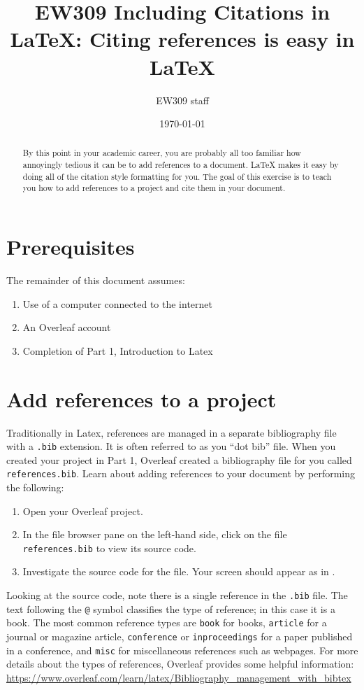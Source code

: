 \documentclass[10pt]{article}
\title{EW309 Including Citations in \LaTeX: Citing references is easy in \LaTeX}
\author{EW309 staff}
\date{\today}
\renewcommand{\LaTeX}{Latex}
\begin{document}
\maketitle 

\begin{abstract}
  By this point in your academic career, you are probably all too familiar how annoyingly tedious it can be to add references to a document. LaTeX makes it easy by doing all of the citation style formatting for you. The goal of this exercise is to teach you how to add references to a project and cite them in your document.
\end{abstract}

\section{Prerequisites}
The remainder of this document assumes:
\begin{enumerate}
\item Use of a computer connected to the internet
\item An Overleaf account
\item Completion of Part 1, Introduction to \LaTeX
\end{enumerate}

\section{Add references to a project}
Traditionally in \LaTeX, references are managed in a separate bibliography file with a \lstinline{.bib} extension. It is often referred to as you ``dot bib'' file. When you created your project in Part 1, Overleaf created a bibliography file for you called \lstinline{references.bib}. Learn about adding references to your document by performing the following:
\begin{enumerate}
\item Open your Overleaf project.
\item In the file browser pane on the left-hand side, click on the file \lstinline{references.bib} to view its source code.
\item Investigate the source code for the file. Your screen should appear as in .
\end{enumerate}

Looking at the source code, note there is a single reference in the \lstinline{.bib} file. The text following the \lstinline{@} symbol classifies the type of reference; in this case it is a book. The most common reference types are \lstinline{book} for books, \lstinline{article} for a journal or magazine article, \lstinline{conference} or \lstinline{inproceedings} for a paper published in a conference, and \lstinline{misc} for miscellaneous references such as webpages. For more details about the types of references, Overleaf provides some helpful information: \url{https://www.overleaf.com/learn/latex/Bibliography_management_with_bibtex}
\end{document}
